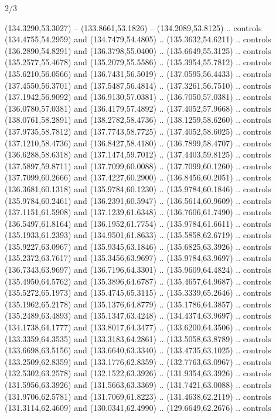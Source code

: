 \begin{flagdescription}{2/3}
\begin{scope}[xshift=0.5\flaglength,yshift=0.5\flagwidth,scale=\flagwidth/180]
\begin{scope}[y=0.8pt, x=0.8pt, yscale=-1,shift={(-168.75,-108.75)}]
  (134.3290,53.3027) -- (133.8661,53.1826) -- (134.2089,53.8125) .. controls
  (134.4755,54.2959) and (134.7479,54.4805) .. (135.3632,54.6211) .. controls
  (136.2890,54.8291) and (136.3798,55.0400) .. (135.6649,55.3125) .. controls
  (135.2577,55.4678) and (135.2079,55.5586) .. (135.3954,55.7812) .. controls
  (135.6210,56.0566) and (136.7431,56.5019) .. (137.0595,56.4433) .. controls
  (137.4550,56.3701) and (137.5487,56.4814) .. (137.3261,56.7510) .. controls
  (137.1942,56.9092) and (136.9130,57.0381) .. (136.7050,57.0381) .. controls
  (136.0780,57.0381) and (136.4179,57.4892) .. (137.4052,57.9668) .. controls
  (138.0761,58.2891) and (138.2782,58.4736) .. (138.1259,58.6260) .. controls
  (137.9735,58.7812) and (137.7743,58.7725) .. (137.4052,58.6025) .. controls
  (137.1210,58.4736) and (136.8427,58.4180) .. (136.7899,58.4707) .. controls
  (136.6288,58.6318) and (137.1474,59.7012) .. (137.4403,59.8125) .. controls
  (137.5897,59.8711) and (137.7099,60.0088) .. (137.7099,60.1260) .. controls
  (137.7099,60.2666) and (137.4227,60.2900) .. (136.8456,60.2051) .. controls
  (136.3681,60.1318) and (135.9784,60.1230) .. (135.9784,60.1846) .. controls
  (135.9784,60.2461) and (136.2391,60.5947) .. (136.5614,60.9609) .. controls
  (137.1151,61.5908) and (137.1239,61.6348) .. (136.7606,61.7490) .. controls
  (136.5497,61.8164) and (136.1952,61.7754) .. (135.9784,61.6611) .. controls
  (135.1933,61.2393) and (134.9501,61.8633) .. (135.5858,62.6719) .. controls
  (135.9227,63.0967) and (135.9345,63.1846) .. (135.6825,63.3926) .. controls
  (135.2372,63.7617) and (135.3456,63.9697) .. (135.9784,63.9697) .. controls
  (136.7343,63.9697) and (136.7196,64.3301) .. (135.9609,64.4824) .. controls
  (135.4950,64.5762) and (135.3896,64.6787) .. (135.4657,64.9687) .. controls
  (135.5272,65.1973) and (135.4745,65.3115) .. (135.3339,65.2646) .. controls
  (135.1962,65.2178) and (135.1376,64.8779) .. (135.1786,64.3857) .. controls
  (135.2489,63.4893) and (135.1347,63.4248) .. (134.4374,63.9697) .. controls
  (134.1738,64.1777) and (133.8017,64.3477) .. (133.6200,64.3506) .. controls
  (133.3359,64.3535) and (133.3183,64.2861) .. (133.5058,63.8789) .. controls
  (133.6698,63.5156) and (133.6640,63.3340) .. (133.4735,63.1025) .. controls
  (133.2509,62.8359) and (133.1776,62.8359) .. (132.7763,63.0967) .. controls
  (132.5302,63.2578) and (132.1522,63.3926) .. (131.9354,63.3926) .. controls
  (131.5956,63.3926) and (131.5663,63.3369) .. (131.7421,63.0088) .. controls
  (131.9706,62.5781) and (131.7069,61.8223) .. (131.4638,62.2119) .. controls
  (131.3114,62.4609) and (130.0341,62.4990) .. (129.6649,62.2676) .. controls

\end{scope}
\end{scope}
\end{flagdescription}
